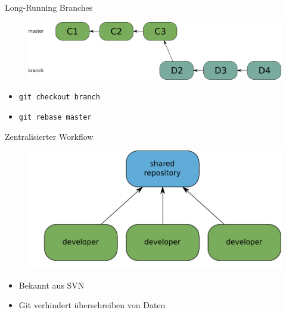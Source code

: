 \begin{frame}{Long-Running Branches}
  \begin{figure} 
  \centering
    \includegraphics[scale=0.4]{images/long-running-branch3.pdf}
  \end{figure}
  \tiny
  \begin{itemize}
    \pause \item \texttt{git checkout branch}
    \pause \item \texttt{git rebase master}
  \end{itemize}
\end{frame}


\begin{frame}{Zentralisierter Workflow}
  \begin{figure} 
  \centering
    \includegraphics[scale=0.6]{images/centralized/centralized-workflow.pdf}
  \end{figure}
  \begin{itemize}
    \pause \item Bekannt aus SVN
    \pause \item Git verhindert überschreiben von Daten
  \end{itemize}
\end{frame}

